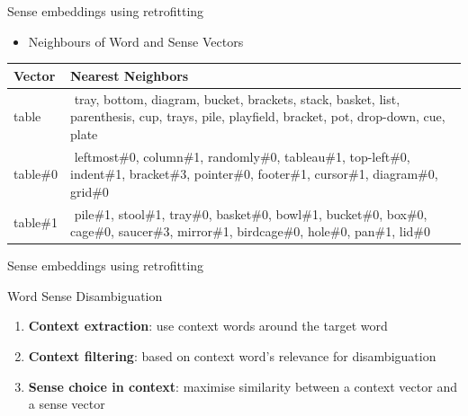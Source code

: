 \documentclass{beamer}
\begin{document}
\begin{frame}{Sense embeddings using retrofitting}

\begin{itemize}
	\item Neighbours of Word and Sense Vectors
\end{itemize}


%

\begin{tabular}{l|p{9cm}}
\bf Vector & \bf {Nearest Neighbors} \\ \toprule
 table & $ $ \alert{tray}, bottom, diagram, \alert{bucket}, brackets, stack, \alert{basket}, list, parenthesis, \alert{cup}, \alert{trays}, \alert{pile}, \alert{playfield}, bracket, \alert{pot}, drop-down, \alert{cue}, \alert{plate} \\ \midrule
 \pause
  table\#0 & $ $ leftmost\#0,  column\#1,  randomly\#0,  tableau\#1, top-left\#0, indent\#1,  bracket\#3,  pointer\#0,  footer\#1, cursor\#1, diagram\#0, grid\#0 \\ \midrule
   table\#1 & $ $ \alert{pile\#1,  stool\#1,  tray\#0,  basket\#0,  bowl\#1,  bucket\#0,  box\#0,  cage\#0,  saucer\#3,      mirror\#1,  birdcage\#0,  hole\#0,  pan\#1,  lid\#0}  \\ 
\end{tabular}
%

	

\end{frame}




\begin{frame}{Sense embeddings using retrofitting}
	
	\begin{block}{Word Sense Disambiguation}
	
	\begin{enumerate} 
	\item \textbf{\alert{Context extraction}}: use context words around the target word
	\item \textbf{\alert{Context filtering}}: based on context word's relevance for disambiguation
	
	\item \textbf{\alert{Sense choice in context}}: maximise similarity between a context vector and a sense vector
	
	\end{enumerate}
	\end{block}

\end{frame}
\end{document}
